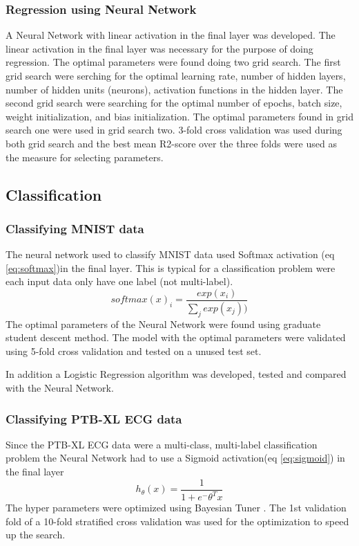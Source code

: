 \documentclass[twocolumn]{cinc}
\begin{document}
\subsubsection{Regression using Neural Network}
A Neural Network with linear activation in the final layer was developed. The linear activation in the final layer was necessary for the purpose of doing regression. The optimal parameters were found doing two grid search. The first grid search were serching for the optimal learning rate, number of hidden layers, number of hidden units (neurons), activation functions in the hidden layer. The second grid search were searching for the optimal number of epochs, batch size, weight initialization, and bias initialization. The optimal parameters found in grid search one were used in grid search two. 3-fold cross validation was used during both grid search and the best mean R2-score over the three folds were used as the measure for selecting parameters.

\subsection{Classification}
\subsubsection{Classifying MNIST data}

The neural network used to classify MNIST data used Softmax activation (eq \ref{eq:softmax})in the final layer. This is typical for a classification problem were each input data only have one label (not multi-label).
\begin{equation}
softmax(x)_i = \frac{exp(x_i)}{\sum_{j}^{ }exp(x_j))}
\label{eq:softmax}
\end{equation}
The optimal parameters of the Neural Network were found using graduate student descent method. The model with the optimal parameters were validated using 5-fold cross validation and tested on a unused test set.

In addition a Logistic Regression algorithm was developed, tested and compared with the Neural Network.

\subsubsection{Classifying PTB-XL ECG data}
Since the PTB-XL ECG data were a multi-class, multi-label classification problem the Neural Network had to use a Sigmoid activation(eq \ref{eq:sigmoid}) in the final layer
\begin{equation}
h_ \theta (x) =  \frac{\mathrm{1} }{\mathrm{1} + e^-\theta^Tx}
    \label{eq:sigmoid}
\end{equation}
The hyper parameters were optimized using Bayesian Tuner \cite{omalley_keras_2019}. The 1st validation fold of a 10-fold stratified cross validation was used for the optimization to speed up the search. 
\end{document}
